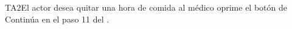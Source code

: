 \begin{UCtrayectoriaA}{TA2}{El actor desea quitar una hora de comida al médico}			
			\UCpaso[\UCactor] oprime el botón  de             
      \UCpaso Continúa en el paso 11 del .
\end{UCtrayectoriaA}